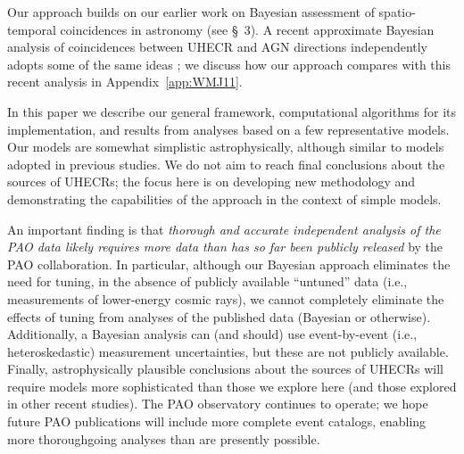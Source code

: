 Our approach builds on our earlier work on Bayesian assessment of
spatio-temporal coincidences in astronomy (see \S~3).  A recent
approximate Bayesian analysis of coincidences between UHECR and AGN
directions independently adopts some of the same ideas \cite{WMJ11-BayesUHECR};
we discuss how our approach compares with this recent analysis in
Appendix~\ref{app:WMJ11}.

In this paper we describe our general framework, computational algorithms
for its implementation, and results from analyses based on a few
representative models.  Our models are somewhat simplistic astrophysically,
although similar to models adopted in previous studies.  We do not aim to
reach final conclusions about the sources of UHECRs; the focus here is on
developing new methodology and demonstrating the capabilities of the
approach in the context of simple models.

An important finding is that {\em thorough and accurate independent analysis
of the PAO data likely requires more data than has so far been publicly
released} by the PAO collaboration.  In particular, although our Bayesian
approach eliminates the need for tuning, in the absence of publicly available
``untuned'' data (i.e., measurements of lower-energy cosmic rays), we cannot
completely eliminate the effects of tuning from analyses of the
published data (Bayesian or otherwise).  Additionally, a Bayesian analysis can
(and should) use event-by-event (i.e., heteroskedastic) measurement
uncertainties, but these are not publicly available.  Finally, astrophysically
plausible conclusions about the sources of UHECRs will require models more
sophisticated than those we explore here (and those explored in other recent
studies). The PAO observatory continues to operate; we hope future PAO
publications will include more complete event catalogs, enabling more
thoroughgoing analyses than are presently possible.
